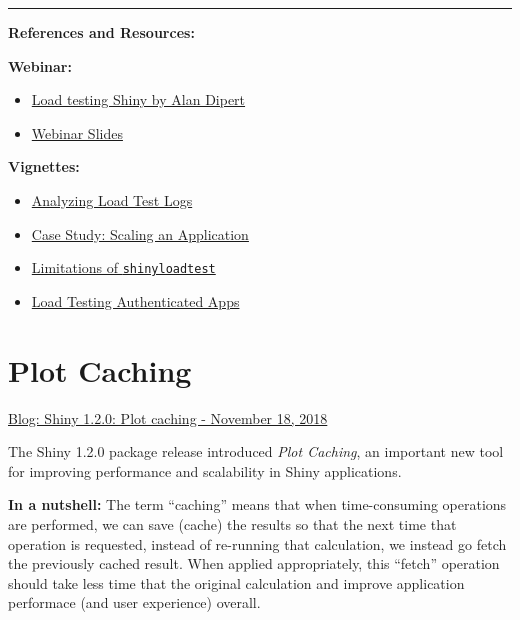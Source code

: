 \documentclass[]{book}
\providecommand{\tightlist}{%
  \setlength{\itemsep}{0pt}\setlength{\parskip}{0pt}}
\theoremstyle{definition}
\theoremstyle{definition}
\theoremstyle{definition}
\theoremstyle{remark}
\begin{document}
\begin{center}\rule{0.5\linewidth}{\linethickness}\end{center}

\textbf{References and Resources:}

\textbf{Webinar:}

\begin{itemize}
\tightlist
\item
  \href{https://resources.rstudio.com/webinars/load-testing-shiny-alan-dipert}{Load
  testing Shiny by Alan Dipert}
\item
  \href{https://github.com/rstudio/webinars/blob/master/63-shinyloadtest/slides.pdf}{Webinar
  Slides}
\end{itemize}

\textbf{Vignettes:}

\begin{itemize}
\tightlist
\item
  \href{https://rstudio.github.io/shinyloadtest/articles/analyzing-load-test-logs.html}{Analyzing
  Load Test Logs}
\item
  \href{https://rstudio.github.io/shinyloadtest/articles/case-study-scaling.html}{Case
  Study: Scaling an Application}
\item
  \href{https://rstudio.github.io/shinyloadtest/articles/limitations-of-shinyloadtest.html}{Limitations
  of \texttt{shinyloadtest}}
\item
  \href{https://rstudio.github.io/shinyloadtest/articles/load-testing-authenticated-apps.html}{Load
  Testing Authenticated Apps}
\end{itemize}

\hypertarget{plot-caching}{%
\chapter{Plot Caching}\label{plot-caching}}

\href{https://resources.rstudio.com/rstudio-blog/shiny-1-2-0-plot-caching}{Blog:
Shiny 1.2.0: Plot caching - November 18, 2018}

The Shiny 1.2.0 package release introduced \emph{Plot Caching}, an
important new tool for improving performance and scalability in Shiny
applications.

\textbf{In a nutshell:} The term ``caching'' means that when
time-consuming operations are performed, we can save (cache) the results
so that the next time that operation is requested, instead of re-running
that calculation, we instead go fetch the previously cached result. When
applied appropriately, this ``fetch'' operation should take less time
that the original calculation and improve application performace (and
user experience) overall.
\end{document}
